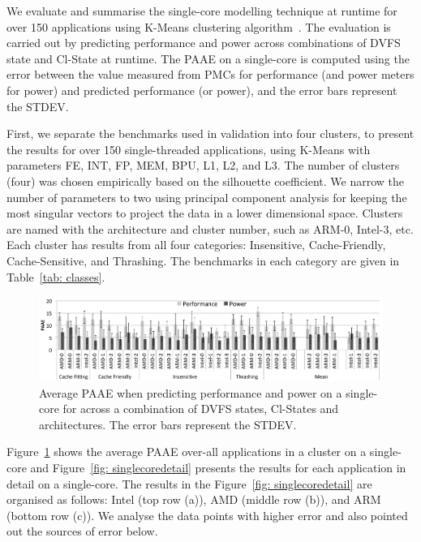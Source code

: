We evaluate and summarise the single-core modelling technique at runtime for over 150
applications using \textsf{K-Means} clustering algorithm~\citep{Kanungo00anefficient}.
The evaluation is carried out by predicting performance and power across combinations
of DVFS state and Cl-State at runtime. The PAAE on a single-core is computed using the error
between the value measured from PMCs for performance (and power meters for power) and
predicted performance (or power), and the error bars represent the STDEV. 



First, we separate the benchmarks used in validation into four \textsf{clusters}, to
present the results for over 150 single-threaded applications, using K-Means with
parameters FE, INT, FP, MEM, BPU, L1, L2, and L3. The number of clusters (four) was chosen
empirically based on the silhouette coefficient. We narrow the number of parameters to two
using principal component analysis for keeping the most singular vectors to project the
data in a lower dimensional space. Clusters are named with the architecture and cluster
number, such as ARM-0, Intel-3, etc. Each cluster has results from all four categories:
Insensitive, Cache-Friendly, Cache-Sensitive, and Thrashing. The benchmarks in each
category are given in Table~\ref{tab: classes}.

\begin{figure}[b]
    \centering
    \includegraphics[width=\textwidth]{Chapter3/Figs/single-core-online/SBAC-PAD/Singlecore-cal.pdf}
    \caption[Average PAAE when predicting performance and power on a single-core]{ Average PAAE when predicting performance and power on a single-core for across a combination of DVFS states, Cl-States and architectures. The error bars represent the STDEV.}
    \label{fig: singlecore eval}
\end{figure}

Figure~\ref{fig: singlecore eval} shows the average PAAE over-all applications in a
cluster on a single-core and Figure~\ref{fig: singlecoredetail} presents the results for
each application in detail on a single-core. The results in the Figure~\ref{fig:
singlecoredetail} are organised as follows: Intel (top row (a)), AMD (middle row (b)), and
ARM (bottom row (c)). We analyse the data points with higher error and also pointed
out the sources of error below.

